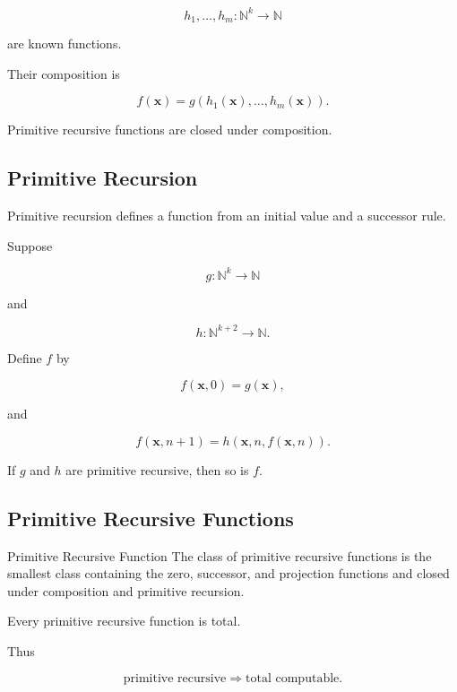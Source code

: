 \[
h_1,\ldots,h_m:
\mathbb{N}^k\to\mathbb{N}
\]

are known functions.

Their composition is

\[
\boxed{
f(\mathbf{x})
=
g
\left(
h_1(\mathbf{x}),
\ldots,
h_m(\mathbf{x})
\right).
}
\]

Primitive recursive functions are closed under composition.

\subsection{Primitive Recursion}
\label{subsec:primitive-recursion-definition}

Primitive recursion defines a function from an initial value and a
successor rule.

Suppose

\[
g:\mathbb{N}^k\to\mathbb{N}
\]

and

\[
h:\mathbb{N}^{k+2}\to\mathbb{N}.
\]

Define \(f\) by

\[
\boxed{
f(\mathbf{x},0)
=
g(\mathbf{x}),
}
\]

and

\[
\boxed{
f(\mathbf{x},n+1)
=
h
\left(
\mathbf{x},
n,
f(\mathbf{x},n)
\right).
}
\]

If \(g\) and \(h\) are primitive recursive, then so is \(f\).

\subsection{Primitive Recursive Functions}
\label{subsec:primitive-recursive-functions}

\begin{definitionbox}{Primitive Recursive Function}
The class of primitive recursive functions is the smallest class containing
the zero, successor, and projection functions and closed under composition
and primitive recursion.
\end{definitionbox}

Every primitive recursive function is total.

Thus

\[
\boxed{
\text{primitive recursive}
\Longrightarrow
\text{total computable}.
}
\]

